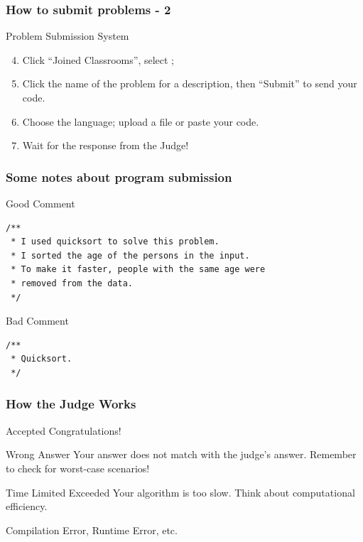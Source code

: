 \documentclass{beamer}
\begin{document}
\begin{frame}
  \frametitle{How to submit problems - 2}

  \begin{block}{Problem Submission System}
    \begin{enumerate}
      \setcounter{enumi}{3}
      \item Click ``Joined Classrooms'', select
        ;
      \item Click the name of the problem for a description, then ``Submit'' to send your code.
      \item Choose the language; upload a file or paste your code.
      \item Wait for the response from the Judge!
    \end{enumerate}
  \end{block}
\end{frame}



\begin{frame}
  \frametitle{Some notes about program submission}
  \begin{block}{Good Comment}
{\small
\begin{verbatim}
/**
 * I used quicksort to solve this problem. 
 * I sorted the age of the persons in the input.
 * To make it faster, people with the same age were 
 * removed from the data.
 */
\end{verbatim}}
  \end{block}
  \begin{block}{Bad Comment}
{\small
\begin{verbatim}
/**
 * Quicksort.
 */
\end{verbatim}}
  \end{block}
\end{frame}

\begin{frame}
  \frametitle{How the Judge Works}
  \begin{block}{Accepted}
    Congratulations!
  \end{block}
  \begin{block}{\alert{Wrong Answer}}
    Your answer does not match with the judge's answer. Remember to
    check for worst-case scenarios!
  \end{block}
  \begin{block}{\alert{Time Limited Exceeded}}
    Your algorithm is too slow. Think about computational efficiency.
  \end{block}
  \begin{block}{}
    Compilation Error, Runtime Error, etc.
  \end{block}
\end{frame}
\end{document}
